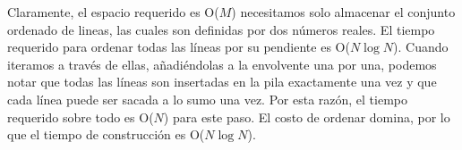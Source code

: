 Claramente, el espacio requerido es O($M$) necesitamos solo almacenar el conjunto ordenado de lineas,
las cuales son definidas por dos números reales. El tiempo requerido para ordenar todas las líneas por su 
pendiente es O($N \log N$). Cuando iteramos a través de ellas, añadiéndolas a la envolvente una por una, 
podemos notar que todas las líneas son insertadas en la pila exactamente una vez y que cada línea puede ser 
sacada a lo sumo una vez. Por esta razón, el tiempo requerido sobre todo es O($N$) para este paso. El costo de ordenar domina, por lo que el tiempo de construcción es O($N \log N$).